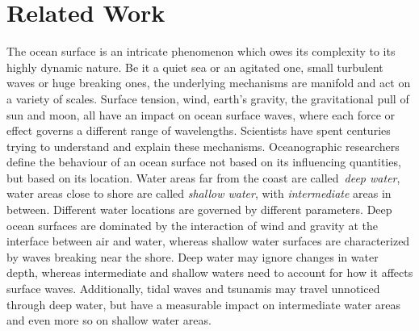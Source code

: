 \chapter{Related Work}
\label{ch:state_of_the_art}
%
The ocean surface is an intricate phenomenon which owes its complexity
to its highly dynamic nature. Be it a quiet sea or an agitated one, small
turbulent waves or huge breaking ones, the underlying mechanisms are manifold
and act on a variety of scales. 
Surface tension, wind, earth's gravity, the gravitational pull of
sun and moon, all have an impact on ocean surface waves, where each force or
effect governs a different range of wavelengths.
Scientists have spent centuries trying to understand and explain these mechanisms.
%
Oceanographic researchers define the behaviour of an ocean surface not based
on its influencing quantities, but based on its location. Water areas far from the
coast are called~\emph{deep water}, water areas close to shore are called
\emph{shallow water}, with \emph{intermediate} areas in between. Different
water locations are governed by different parameters. Deep ocean surfaces are
dominated by the interaction of wind and gravity at the interface
between air and water, whereas shallow water surfaces are characterized by waves
breaking near the shore. Deep water may ignore changes in water depth,
whereas intermediate and shallow waters need to account for how it affects
surface waves. Additionally, tidal waves and tsunamis may travel unnoticed
through deep water, but have a measurable impact on intermediate water areas
and even more so on shallow water areas.\\
% 
%

